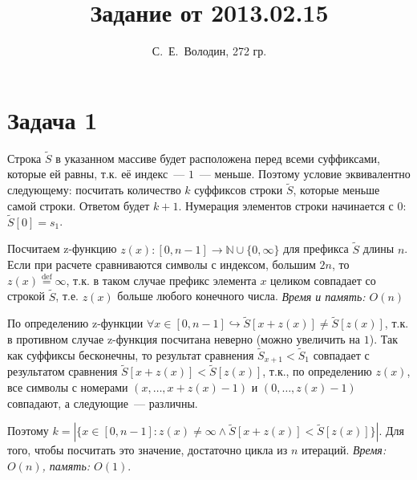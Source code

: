 \documentclass{article}
\title{Задание от 2013.02.15}
\author{С.~Е.~Володин, 272 гр.}
\date{}
\begin{document}
\maketitle
\section{Задача 1}
Строка $\tilde{S}$ в указанном массиве будет расположена перед всеми суффиксами, которые ей равны, т.к. её индекс~--- $1$~--- меньше. Поэтому условие эквивалентно следующему: посчитать количество $k$ суффиксов строки $\tilde{S}$, которые меньше самой строки. Ответом будет $k+1$. Нумерация элементов строки начинается с $0$: $\tilde{S}[0]=s_1$.

Посчитаем z-функцию \begin{math}z(x):[0,n-1]\rightarrow\mathbb{N}\cup\{0,\infty\}\end{math} для префикса $\tilde{S}$ длины $n$. Если при расчете сравниваются символы с индексом, большим $2n$, то $z(x)\stackrel{\mathrm{def}}{=}\infty$, т.к. в таком случае префикс элемента $x$ целиком совпадает со строкой $\tilde{S}$, т.е.  $z(x)$ больше любого конечного числа. {\em Время и память: $O(n)$}

По определению z-функции $\forall x\in[0,n-1]\hookrightarrow\tilde{S}[x+z(x)]\neq\tilde{S}[z(x)]$, т.к. в противном случае z-функция посчитана неверно (можно увеличить на $1$). Так как суффиксы бесконечны, то результат сравнения $\tilde{S}_{x+1}<\tilde{S}_1$ совпадает с результатом сравнения $\tilde{S}[x+z(x)]<\tilde{S}[z(x)]$, т.к., по определению $z(x)$, все символы с номерами $(x,\dots,x+z(x)-1)$ и $(0,\dots,z(x)-1)$ совпадают, а следующие~--- различны.

Поэтому $k=|\{x\in[0,n-1]:z(x)\neq\infty\wedge\tilde{S}[x+z(x)]<\tilde{S}[z(x)]\}|$. Для того, чтобы посчитать это значение, достаточно цикла из $n$ итераций. {\em Время: $O(n)$, память: $O(1)$}.
\end{document}
